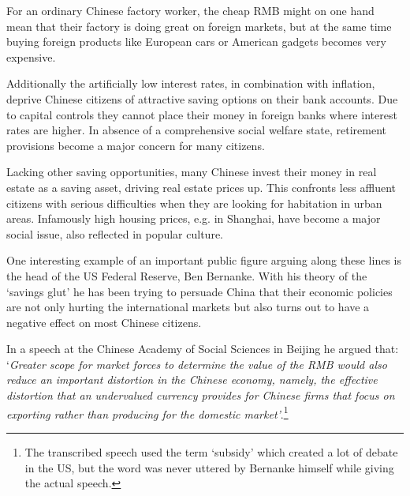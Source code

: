 For an ordinary Chinese factory worker, the cheap RMB might on one hand 
mean that their factory is doing great on foreign markets, but at the 
same time buying foreign products like European cars or American gadgets 
becomes very expensive. 

Additionally the artificially low interest rates, in combination with 
inflation, deprive Chinese citizens of attractive saving options on 
their bank accounts. Due to capital controls they cannot place their 
money in foreign banks where interest rates are higher. In absence of a 
comprehensive social welfare state, retirement provisions become a major 
concern for many citizens.

Lacking other saving opportunities, many Chinese invest their money in 
real estate as a saving asset, driving real estate prices up.  This 
confronts less affluent citizens with serious difficulties when they are 
looking for habitation in urban areas.  Infamously high housing prices, 
e.g.  in Shanghai, have become a major social issue, also reflected in 
popular culture. 

One interesting example of an important public figure arguing along 
these lines is the head of the US Federal Reserve, Ben Bernanke. With his theory of the `savings glut' he has 
been trying to persuade China that their economic policies are not only 
hurting the international markets but also turns out to have a negative 
effect on most Chinese citizens.  

In a speech at the Chinese Academy of Social Sciences in Beijing he 
argued that: `\textit{Greater scope for market forces to determine the 
	value of the RMB would also reduce an important distortion in the 
	Chinese economy, namely, the effective distortion that an 
undervalued currency provides for Chinese firms that focus on exporting 
rather than producing for the domestic market'}.\footnote{The 
	transcribed speech \cite{Bernanke06} used the term `subsidy' which 
created a lot of debate in the US, but the word was never uttered by 
Bernanke himself while giving the actual speech\cite{reuters06}.}

